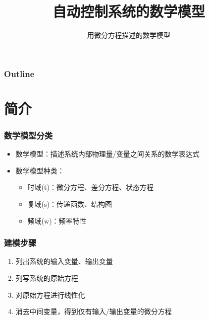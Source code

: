 \documentclass{beamer}
\subtitle{用微分方程描述的数学模型}
\title{自动控制系统的数学模型}
\author{}
\date{}
\begin{document}
\maketitle

\begin{frame}
\frametitle{Outline}
\setcounter{tocdepth}{3}
\tableofcontents
\end{frame}














\section{简介}
\label{sec-1}
\begin{frame}
\frametitle{数学模型分类}
\label{sec-1-1}

\begin{itemize}
\item <2->数学模型：描述系统内部物理量/变量之间关系的数学表达式
\item <3->数学模型种类：
\begin{itemize}
\item <4->时域(t)：微分方程、差分方程、状态方程
\item <5->复域(s)：传递函数、结构图
\item <6->频域(w)：频率特性
\end{itemize}
\end{itemize}
\end{frame}
\begin{frame}
\frametitle{建模步骤}
\label{sec-1-2}

\begin{enumerate}
\item <2->列出系统的输入变量、输出变量
\item <3->列写系统的原始方程
\item <4->对原始方程进行线性化
\item <5->消去中间变量，得到仅有输入/输出变量的微分方程
\end{enumerate}
\end{frame}
\end{document}
